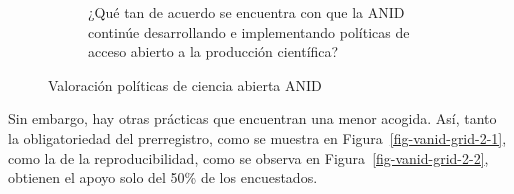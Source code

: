 \documentclass[
  letterpaper,
  DIV=11,
  numbers=noendperiod]{scrreprt}
\begin{document}
\begin{figure}
{\begin{figure}
{}

\caption{¿Qué tan de acuerdo se encuentra con que la ANID continúe
desarrollando e implementando políticas de acceso abierto a la
producción científica?}

\end{figure}

}

\caption{\label{fig-vanid-grid}Valoración políticas de ciencia abierta
ANID}

\end{figure}

Sin embargo, hay otras prácticas que encuentran una menor acogida. Así,
tanto la obligatoriedad del prerregistro, como se muestra en
Figura~\ref{fig-vanid-grid-2-1}, como la de la reproducibilidad, como se
observa en Figura~\ref{fig-vanid-grid-2-2}, obtienen el apoyo solo del
50\% de los encuestados.
\end{document}

